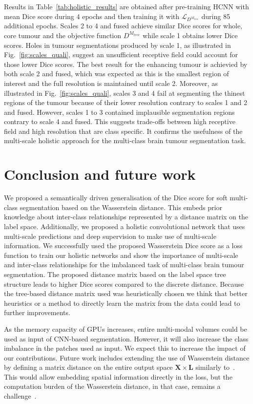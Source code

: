\documentclass[runningheads,orivec,a4paper]{llncs}
\begin{document}
Results in Table~\ref{tab:holistic_results} are obtained after pre-training HCNN with mean Dice score during 4 epochs and then training it with $\mathcal{L}_{D^{M_{tree}}}$ during 85 additional epochs.
Scales 2 to 4 and fused achieve similar Dice scores for whole, core tumour and the objective function $D^{M_{tree}}$ while scale 1 obtains lower Dice scores. Holes in tumour segmentations produced by scale 1, as illustrated in Fig.~\ref{fig:scales_quali}, suggest an unsufficient receptive field could account for those lower Dice scores.
The best result for the enhancing tumour is achievied by both scale 2 and fused, which was expected as this is the smallest region of interest and the full resolution is maintained until scale 2.
Moreover, as illustrated in Fig.~\ref{fig:scales_quali}, scales 3 and 4 fail at segmenting the thinest regions of the tumour because of their lower resolution contrary to scales 1 and 2 and fused.
However, scales 1 to 3 contained implausible segmentation regions contrary to scale 4 and fused.
This suggests trade-offs between high receptive field and high resolution that are class specific. It confirms the usefulness of the multi-scale holistic approach for the multi-class brain tumour segmentation task.



\section{Conclusion and future work}

We proposed a semantically driven generalisation of the Dice score for
soft multi-class segmentation based on the Wasserstein distance. This
embeds prior knowledge about inter-class relationships represented by
a distance  matrix on the label space. 
Additionally, we proposed a holistic convolutional network that uses
multi-scale predictions and deep supervision to make use of multi-scale
information. 
We successfully used the proposed Wasserstein Dice score as a loss
function to train our holistic networks and show the
importance of multi-scale and inter-class relationships for the
imbalanced task of multi-class brain tumour segmentation.
The proposed distance matrix based on the label space tree structure leads to higher Dice scores compared to the discrete distance.
Because the tree-based distance matrix used was heuristically chosen we think that better heuristics or a method to directly learn the matrix from the data could lead to further improvements.

As the memory capacity of GPUs increases, entire multi-modal volumes
could be used as input of CNN-based segmentation. However, it will also increase the class imbalance in the patches used as input.
We expect this to increase the impact of our contributions. 
Future work includes extending the use of Wasserstein distance by
defining a matrix distance on the entire output space
$\mathbf{X}\times\mathbf{L}$ similarly to~\cite{manifold_ot}. This would
allow embedding spatial information directly in the loss, but the
computation burden of the Wasserstein distance, in that case, remains a
challenge~\cite{fast_emd}. 
\end{document}
